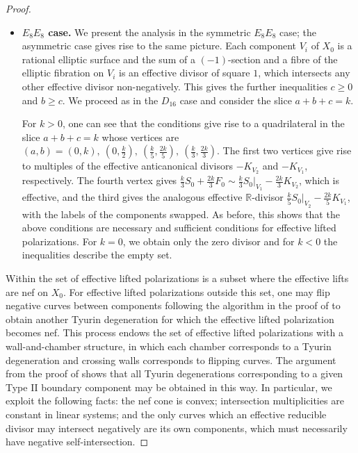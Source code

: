 \documentclass[a4paper]{amsart}
\theoremstyle{definition}
\theoremstyle{plain}
\theoremstyle{remark}
\newcommand{\bR}{\mathbb{R}}
\numberwithin{figure}{section}
\numberwithin{table}{section}
\begin{document}
\begin{proof}
\begin{itemize}[leftmargin=*]
\item \textbf{$E_8E_8$ case.} We present the analysis in the symmetric $E_8E_8$ case; the asymmetric case gives rise to the same picture. Each component $V_i$ of $X_0$ is a rational elliptic surface and the sum of a $(-1)$-section and a fibre of the elliptic fibration on $V_i$ is an effective divisor of square $1$, which intersects any other effective divisor non-negatively. This gives the further inequalities $c \geq 0$ and $b \geq c$. We proceed as in the $D_{16}$ case and consider the slice $a+b+c=k$.

For $k>0$, one can see that the conditions give rise to a quadrilateral in the slice $a+b+c = k$ whose vertices are $(a,b) = (0,k),~\left(0,\frac{k}{2}\right), ~\left(\frac{k}{5},\frac{2k}{5}\right),~\left(\frac{k}{3},\frac{2k}{3}\right)$. The first two vertices give rise to multiples of the effective anticanonical divisors $-K_{V_2}$ and $-K_{V_1}$, respectively. The fourth vertex gives $\frac{k}{3}S_0 + \frac{2k}{3}F_0 \sim \frac{k}{3}S_0|_{V_1} - \frac{2k}{3}K_{V_2}$, which is effective, and the third gives the analogous effective $\bR$-divisor $\frac{k}{5}S_0|_{V_2} - \frac{2k}{5}K_{V_1}$, with the labels of the components swapped. As before, this shows that the above conditions are necessary and sufficient conditions for effective lifted polarizations. For $k=0$, we obtain only the zero divisor and for $k<0$ the inequalities describe the empty set.
\end{itemize}

\noindent Within the set of effective lifted polarizations is a subset where the effective lifts are nef on $X_0$. For effective lifted polarizations outside this set, one may flip negative curves between components following the algorithm in the proof of \cite[Theorem 1]{bgd4} to obtain another Tyurin degeneration for which the effective lifted polarization becomes nef. This process endows the set of effective lifted polarizations with a wall-and-chamber structure, in which each chamber corresponds to a Tyurin degeneration and crossing walls corresponds to flipping curves. The argument from the proof of \cite[Theorem 2]{t2dk3sd4} shows that all Tyurin degenerations corresponding to a given Type II boundary component may be obtained in this way. In particular, we exploit the following facts: the nef cone is convex; intersection multiplicities are constant in linear systems; and the only curves which an effective reducible divisor may intersect negatively are its own components, which must necessarily have negative self-intersection.


\end{proof}
\end{document}
